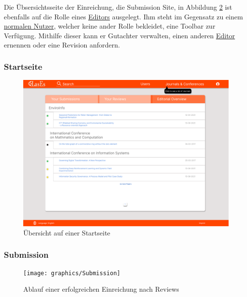 Die Übsersichtsseite der Einreichung, die Submission Site, in Abbildung \ref{fig:submission} ist ebenfalls auf die Rolle eines \hyperref[glo:editor]{Editors} ausgelegt.
Ihm steht im Gegensatz zu einem \hyperref[glo:regnutzer]{normalen Nutzer}, welcher keine ander Rolle bekleidet, eine Toolbar zur Verfügung.
Mithilfe dieser kann er Gutachter verwalten, einen anderen \hyperref[glo:editor]{Editor} ernennen oder eine Revision anfordern.


\subsubsection{Startseite}

\begin{figure}[H]
	\centering
	\includegraphics[width=0.85\linewidth]{graphics/Homepage}
	\caption{Übersicht auf einer Startseite}
	\label{fig:homepageMockup}
\end{figure}

\subsubsection{Submission}

\begin{figure}[H]
	\centering
	\texttt{[image: graphics/Submission]}
	\caption{Ablauf einer erfolgreichen Einreichung nach Reviews}
	\label{fig:submission}
\end{figure}